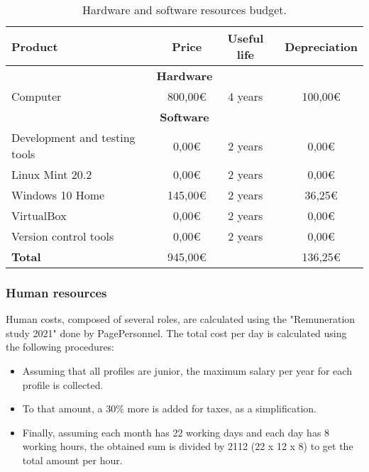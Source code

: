 \begin{table}[!htb]
\centering
  \begin{tabular}{| l | c | c | c |}
  \hline \textbf{Product} & \textbf{Price} & \textbf{Useful life} & \textbf{Depreciation} \\ \hline 
  \multicolumn{4}{|c|}{ \textbf{Hardware}} \\ \hline
  Computer & 800,00€ & 4 years & 100,00€        \\ \hline 
  \multicolumn{4}{|c|}{  \textbf{Software}} \\ \hline
  Development and testing tools & 0,00€ & 2 years & 0,00€        \\ \hline
  Linux Mint 20.2 & 0,00€ & 2 years & 0,00€        \\ \hline
  Windows 10 Home & 145,00€ & 2 years & 36,25€        \\ \hline
  VirtualBox & 0,00€ & 2 years & 0,00€        \\ \hline
  Version control tools & 0,00€ & 2 years & 0,00€		\\ \hline
  \textbf{Total} & 945,00€ &  & 136,25€  \\ \hline 
  \end{tabular}
  \caption{Hardware and software resources budget.} \vspace{3pt}
  \label{tab:hardsoft}
\end{table}

\pagebreak
\subsubsection{Human resources}
\label{sssec:humanResources}

Human costs, composed of several roles, are calculated using the "Remuneration study 2021" done by PagePersonnel\cite{PagePersonnel}. The total cost per day is calculated using the following procedures:
\begin{itemize}
\item Assuming that all profiles are junior, the maximum salary per year for each profile is collected.
\item To that amount, a 30\% more is added for taxes, as a simplification.
\item Finally, assuming each month has 22 working days and each day has 8 working hours, the obtained sum is divided by 2112 (22 x 12 x 8) to get the total amount per hour.
\end{itemize}

